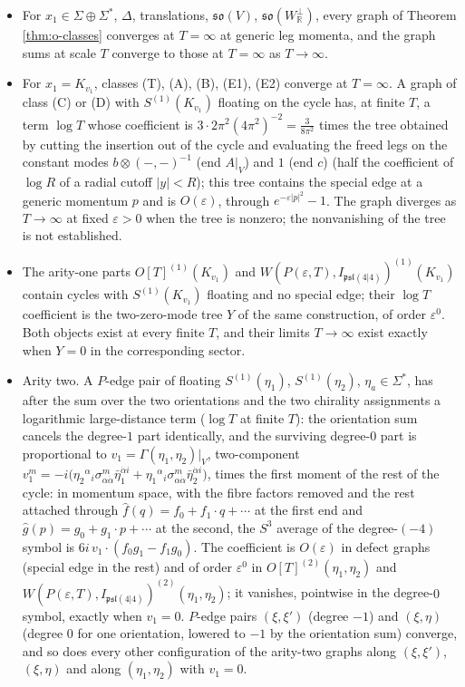 \begin{theorem}
\label{thm:o-ir}
\begin{itemize}
\item[(i)] For $x_1\in\Sigma\oplus\Sigma^*$, $\Delta$, translations, $\mathfrak{so}(V)$, $\mathfrak{so}(W_{\mathbb R}^\perp)$, every graph of Theorem \ref{thm:o-classes} converges at $T=\infty$ at generic leg momenta, and the graph sums at scale $T$ converge to those at $T=\infty$ as $T\to\infty$.
\item[(ii)] For $x_1=K_{v_1}$, classes (T), (A), (B), (E1), (E2) converge at $T=\infty$. A graph of class (C) or (D) with $S^{(1)}(K_{v_1})$ floating on the cycle has, at finite $T$, a term $\log T$ whose coefficient is $3\cdot2\pi^2(4\pi^2)^{-2}=\tfrac{3}{8\pi^2}$ times the tree obtained by cutting the insertion out of the cycle and evaluating the freed legs on the constant modes $b\otimes(-,-)^{-1}$ (end $A|_V$) and $1$ (end $c$) (half the coefficient of $\log R$ of a radial cutoff $|y|<R$); this tree contains the special edge at a generic momentum $p$ and is $O(\varepsilon)$, through $e^{-\varepsilon|p|^2}-1$. The graph diverges as $T\to\infty$ at fixed $\varepsilon>0$ when the tree is nonzero; the nonvanishing of the tree is not established.
\item[(iii)] The arity-one parts $O[T]^{(1)}(K_{v_1})$ and $W(P(\varepsilon,T),I_{\mathfrak{psl}(4|4)})^{(1)}(K_{v_1})$ contain cycles with $S^{(1)}(K_{v_1})$ floating and no special edge; their $\log T$ coefficient is the two-zero-mode tree $Y$ of the same construction, of order $\varepsilon^0$. Both objects exist at every finite $T$, and their limits $T\to\infty$ exist exactly when $Y=0$ in the corresponding sector.
\item[(iv)] Arity two. A $P$-edge pair of floating $S^{(1)}(\eta_1)$, $S^{(1)}(\eta_2)$, $\eta_a\in\Sigma^*$, has after the sum over the two orientations and the two chirality assignments a logarithmic large-distance term ($\log T$ at finite $T$): the orientation sum cancels the degree-$1$ part identically, and the surviving degree-$0$ part is proportional to $v_1=\Gamma(\eta_1,\eta_2)|_V$, two-component $v_1^m=-i\big(\eta_2{}^\alpha{}_i\sigma^m_{\alpha\dot\alpha}\bar\eta_1^{\dot\alpha i}+\eta_1{}^\alpha{}_i\sigma^m_{\alpha\dot\alpha}\bar\eta_2^{\dot\alpha i}\big)$, times the first moment of the rest of the cycle: in momentum space, with the fibre factors removed and the rest attached through $\hat f(q)=f_0+f_1\cdot q+\cdots$ at the first end and $\hat g(p)=g_0+g_1\cdot p+\cdots$ at the second, the $S^3$ average of the degree-$(-4)$ symbol is $6i\,v_1\cdot(f_0g_1-f_1g_0)$. The coefficient is $O(\varepsilon)$ in defect graphs (special edge in the rest) and of order $\varepsilon^0$ in $O[T]^{(2)}(\eta_1,\eta_2)$ and $W(P(\varepsilon,T),I_{\mathfrak{psl}(4|4)})^{(2)}(\eta_1,\eta_2)$; it vanishes, pointwise in the degree-$0$ symbol, exactly when $v_1=0$. $P$-edge pairs $(\xi,\xi')$ (degree $-1$) and $(\xi,\eta)$ (degree $0$ for one orientation, lowered to $-1$ by the orientation sum) converge, and so does every other configuration of the arity-two graphs along $(\xi,\xi')$, $(\xi,\eta)$ and along $(\eta_1,\eta_2)$ with $v_1=0$.

\end{itemize}
\end{theorem}
